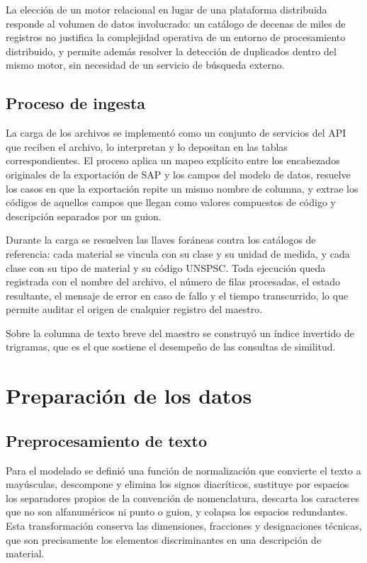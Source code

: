 La elección de un motor relacional en lugar de una plataforma distribuida responde al volumen de datos involucrado: un catálogo de decenas de miles de registros no justifica la complejidad operativa de un entorno de procesamiento distribuido, y permite además resolver la detección de duplicados dentro del mismo motor, sin necesidad de un servicio de búsqueda externo.

\subsection{Proceso de ingesta}
La carga de los archivos se implementó como un conjunto de servicios del API que reciben el archivo, lo interpretan y lo depositan en las tablas correspondientes. El proceso aplica un mapeo explícito entre los encabezados originales de la exportación de SAP y los campos del modelo de datos, resuelve los casos en que la exportación repite un mismo nombre de columna, y extrae los códigos de aquellos campos que llegan como valores compuestos de código y descripción separados por un guion.

Durante la carga se resuelven las llaves foráneas contra los catálogos de referencia: cada material se vincula con su clase y su unidad de medida, y cada clase con su tipo de material y su código UNSPSC. Toda ejecución queda registrada con el nombre del archivo, el número de filas procesadas, el estado resultante, el mensaje de error en caso de fallo y el tiempo transcurrido, lo que permite auditar el origen de cualquier registro del maestro.

Sobre la columna de texto breve del maestro se construyó un índice invertido de trigramas, que es el que sostiene el desempeño de las consultas de similitud.

\section{Preparación de los datos}

\subsection{Preprocesamiento de texto}
Para el modelado se definió una función de normalización que convierte el texto a mayúsculas, descompone y elimina los signos diacríticos, sustituye por espacios los separadores propios de la convención de nomenclatura, descarta los caracteres que no son alfanuméricos ni punto o guion, y colapsa los espacios redundantes. Esta transformación conserva las dimensiones, fracciones y designaciones técnicas, que son precisamente los elementos discriminantes en una descripción de material.

